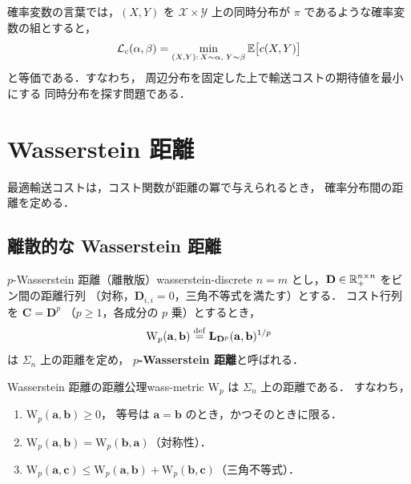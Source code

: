 確率変数の言葉では，$(X, Y)$ を $\mathcal{X} \times \mathcal{Y}$
上の同時分布が $\pi$ であるような確率変数の組とすると，
\[
  \mathcal{L}_c(\alpha, \beta)
  = \min_{(X,Y):\, X \sim \alpha,\; Y \sim \beta}
  \mathbb{E}\bigl[c(X, Y)\bigr]
\]
と等価である．すなわち，
周辺分布を固定した上で輸送コストの期待値を最小にする
同時分布を探す問題である．


\section{Wasserstein 距離}\label{sec:wasserstein}

最適輸送コストは，コスト関数が距離の冪で与えられるとき，
確率分布間の距離を定める．

\subsection{離散的な Wasserstein 距離}\label{subsec:wasserstein-discrete}

\begin{definition}{$p$-Wasserstein 距離（離散版）}{wasserstein-discrete}
$n = m$ とし，$\mathbf{D} \in \mathbb{R}^{n \times n}_+$ をビン間の距離行列
（対称，$\mathbf{D}_{i,i}=0$，三角不等式を満たす）とする．
コスト行列を $\mathbf{C} = \mathbf{D}^p$
（$p \geq 1$，各成分の $p$ 乗）とするとき，
\begin{equation}\label{eq:wasserstein-discrete}
  \mathrm{W}_p(\mathbf{a}, \mathbf{b})
  \overset{\mathrm{def}}{=} \mathbf{L}_{\mathbf{D}^p}(\mathbf{a}, \mathbf{b})^{1/p}
\end{equation}
は $\Sigma_n$ 上の距離を定め，
\textbf{$p$-Wasserstein 距離}と呼ばれる．
\end{definition}

\begin{proposition}{Wasserstein 距離の距離公理}{wass-metric}
$\mathrm{W}_p$ は $\Sigma_n$ 上の距離である．
すなわち，
\begin{enumerate}
  \item $\mathrm{W}_p(\mathbf{a}, \mathbf{b}) \geq 0$，
    等号は $\mathbf{a} = \mathbf{b}$ のとき，かつそのときに限る．
  \item $\mathrm{W}_p(\mathbf{a}, \mathbf{b})
    = \mathrm{W}_p(\mathbf{b}, \mathbf{a})$（対称性）．
  \item $\mathrm{W}_p(\mathbf{a}, \mathbf{c})
    \leq \mathrm{W}_p(\mathbf{a}, \mathbf{b})
    + \mathrm{W}_p(\mathbf{b}, \mathbf{c})$（三角不等式）．
\end{enumerate}
\end{proposition}

